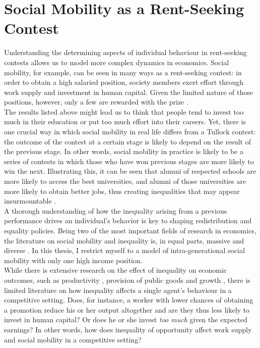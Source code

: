 \section{Social Mobility as a Rent-Seeking Contest}
\label{sec:soc_mob}

Understanding the determining aspects of individual behaviour in rent-seeking contests allows us to model more complex dynamics in economics. Social mobility, for example, can be seen in many ways as a rent-seeking contest: in order to obtain a high salaried position, society members exert effort through work supply and investment in human capital. Given the limited nature of those positions, however, only a few are rewarded with the prize \citep{burkhauser2011}.\\

The results listed above might lead us to think that people tend to invest too much in their education or put too much effort into their careers. Yet, there is one crucial way in which social mobility in real life differs from a Tullock contest: the outcome of the contest at a certain stage is likely to depend on the result of the previous stage. In other words, social mobility in practice is likely to be a series of contests in which those who have won previous stages are more likely to win the next. Illustrating this, it can be seen that alumni of respected schools are more likely to access the best universities, and alumni of those universities are more likely to obtain better jobs, thus creating inequalities that may appear insurmountable \citep{sewell1971}.\\

A thorough understanding of how the inequality arising from a previous performance drives an individual's behavior is key to shaping redistribution and equality policies. Being two of the most important fields of research in economics, the literature on social mobility and inequality is, in equal parts, massive and diverse \citep{nolan2011, atkinson2015, lipset2018, fields1999}. In this thesis, I restrict myself to a model of intra-generational social mobility with only one high income position.\\ 

While there is extensive research on the effect of inequality on economic outcomes, such as productivity \citep{persson1994, ku2012}, provision of public goods \citep{fehr1999} and growth \citep{ehrhart2009}, there is limited literature on how inequality affects a single agent's behaviour in a competitive setting. Does, for instance, a worker with lower chances of obtaining a promotion reduce his or her output altogether and are they thus less likely to invest in human capital? Or does he or she invest \textit{too much} given the expected earnings? In other words, how does inequality of opportunity affect work supply and social mobility in a competitive setting?\\

